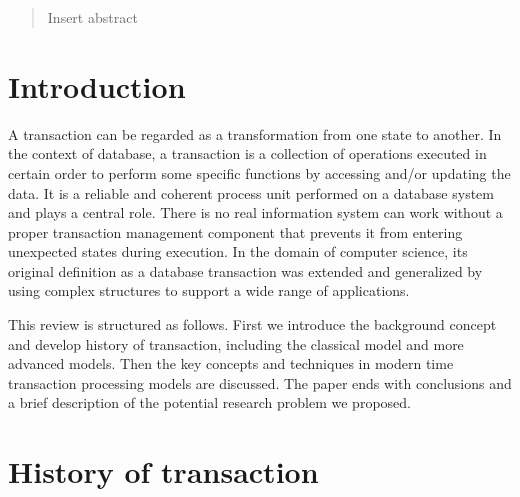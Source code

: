 \documentclass{sig-alternate-05-2015}
\begin{document}

\maketitle
\begin{abstract}
Insert abstract
\end{abstract}




\section{Introduction}


A transaction can be regarded as a transformation from one state to another. In the context of database, a transaction is a collection of operations executed in certain order to perform some specific functions by accessing and/or updating the data. It is a reliable and coherent process unit performed on a database system and plays a central role. There is no real information system can work without a proper transaction management component that prevents it from entering unexpected states during execution. In the domain of computer science, its original definition as a database transaction was extended and generalized by using complex structures to support a wide range of applications.

This review is structured as follows. First we introduce the background concept and develop history of transaction, including the classical model and more advanced models. Then the key concepts and techniques in modern time transaction processing models are discussed. The paper ends with conclusions and a brief description of the potential research problem we proposed.


\section{History of transaction}
\end{document}
